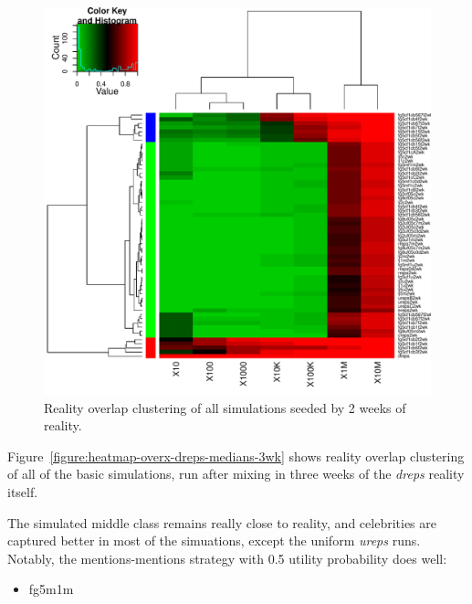 \documentclass[10pt,oneside]{memoir}
\begin{document}
\begin{Spacing}{2}
\begin{figure}
\begin{center}
    \includegraphics{figures/heatmap-overx-dreps-medians-2wk}
    \caption{Reality overlap clustering of all simulations seeded by 2 weeks of reality.}
    \label{figure:heatmap-overx-dreps-medians-2wk}
\end{center}
\end{figure}
Figure~\ref{figure:heatmap-overx-dreps-medians-3wk} shows reality overlap clustering of all of the basic simulations, run after mixing in three weeks of the {\itshape dreps} reality itself.


The simulated middle class remains really close to reality, and celebrities are captured better in most of the simuations, except the uniform {\itshape ureps} runs.
Notably, the mentions-mentions strategy with 0.5 utility probability does well:


\begin{itemize}


\item fg5m1m
\end{itemize}



\end{Spacing}
\end{document}
